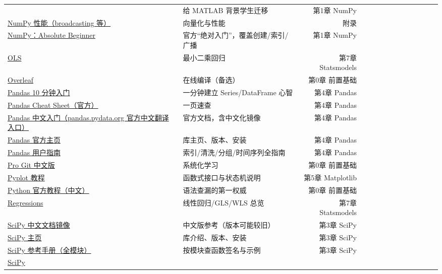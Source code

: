 {\begin{longtable}[]
{for MATLAB users} & 给 MATLAB 背景学生迁移 & 第1章 NumPy \\
\href{https://numpy.org/doc/stable/user/basics.broadcasting.html}{NumPy
性能（broadcasting 等）} & 向量化与性能 & 附录 \\
\href{https://numpy.org/doc/stable/user/absolute_beginners.html}{NumPy：Absolute
Beginner} & 官方``绝对入门''，覆盖创建/索引/广播 & 第1章 NumPy \\
\href{https://www.statsmodels.org/stable/generated/statsmodels.regression.linear_model.OLS.html}{OLS}
& 最小二乘回归 & 第7章 Statsmodels \\
\href{https://www.overleaf.com/}{Overleaf} & 在线编译（备选） & 第0章
前置基础 \\
\href{https://pandas.pydata.org/docs/user_guide/10min.html}{Pandas 10
分钟入门} & 一分钟建立 Series/DataFrame 心智 & 第4章 Pandas \\
\href{https://pandas.pydata.org/Pandas_Cheat_Sheet.pdf}{Pandas Cheat
Sheet（官方）} & 一页速查 & 第4章 Pandas \\
\href{https://pandas.pydata.org/docs/}{Pandas
中文入门（pandas.pydata.org 官方中文翻译入口）} & 官方文档，含中文化镜像
& 第4章 Pandas \\
\href{https://pandas.pydata.org/}{Pandas 官方主页} & 库主页、版本、安装
& 第4章 Pandas \\
\href{https://pandas.pydata.org/docs/user_guide/index.html}{Pandas
用户指南} & 索引/清洗/分组/时间序列全指南 & 第4章 Pandas \\
\href{https://git-scm.com/book/zh/v2}{Pro Git 中文版} & 系统化学习 &
第0章 前置基础 \\
\href{https://matplotlib.org/stable/tutorials/pyplot.html}{Pyplot 教程}
& 函数式接口与状态机说明 & 第5章 Matplotlib \\
\href{https://docs.python.org/zh-cn/3/tutorial/}{Python
官方教程（中文）} & 语法查漏的第一权威 & 第0章 前置基础 \\
\href{https://www.statsmodels.org/stable/regression.html}{Regressions} &
线性回归/GLS/WLS 总览 & 第7章 Statsmodels \\
\href{https://docs.scipy.org.cn/doc/scipy/}{SciPy 中文文档镜像} &
中文版参考（版本可能较旧） & 第3章 SciPy \\
\href{https://scipy.org/}{SciPy 主页} & 库介绍、版本、安装 & 第3章
SciPy \\
\href{https://docs.scipy.org/doc/scipy/reference/}{SciPy
参考手册（全模块）} & 按模块查函数签名与示例 & 第3章 SciPy \\
\href{https://docs.scipy.org/doc/scipy/tutorial/}{SciPy
}
\end{longtable}}
